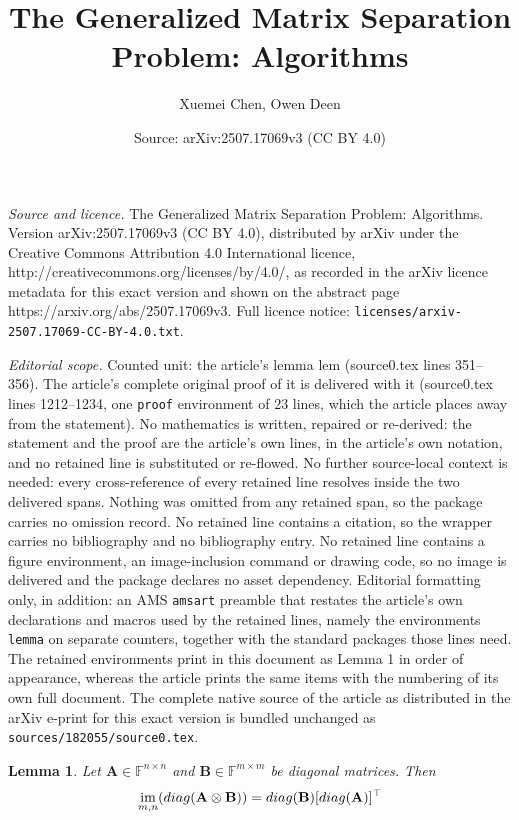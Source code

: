 \documentclass[10pt,a4paper]{amsart}
\title{The Generalized Matrix Separation Problem: Algorithms}
\author{Xuemei Chen, Owen Deen}
\date{Source: arXiv:2507.17069v3 (CC BY 4.0)}
\newtheorem{lemma}{Lemma}
\newcommand{\diag}{{\rm{diag}}}
\DeclareMathOperator*{\im}{{\rm{im}}}
\newcommand{\mA}{\mathbf{A}}
\newcommand{\mB}{\mathbf{B}}
\begin{document}
\maketitle

\noindent\emph{Source and licence.} The Generalized Matrix Separation Problem: Algorithms. Version arXiv:2507.17069v3 (CC BY 4.0), distributed by arXiv under the Creative Commons Attribution 4.0 International licence, http://creativecommons.org/licenses/by/4.0/, as recorded in the arXiv licence metadata for this exact version and shown on the abstract page https://arxiv.org/abs/2507.17069v3. Full licence notice: \texttt{licenses/arxiv-2507.17069-CC-BY-4.0.txt}.\par\smallskip

\noindent\textit{Editorial scope.} Counted unit: the article's lemma lem (source0.tex lines 351--356). The article's complete original proof of it is delivered with it (source0.tex lines 1212--1234, one \texttt{proof} environment of 23 lines, which the article places away from the statement). No mathematics is written, repaired or re-derived: the statement and the proof are the article's own lines, in the article's own notation, and no retained line is substituted or re-flowed.  No further source-local context is needed: every cross-reference of every retained line resolves inside the two delivered spans.  Nothing was omitted from any retained span, so the package carries no omission record.  No retained line contains a citation, so the wrapper carries no bibliography and no bibliography entry.  No retained line contains a figure environment, an image-inclusion command or drawing code, so no image is delivered and the package declares no asset dependency.  Editorial formatting only, in addition: an AMS \texttt{amsart} preamble that restates the article's own declarations and macros used by the retained lines, namely the environments \texttt{lemma} on separate counters, together with the standard packages those lines need.  The retained environments print in this document as Lemma 1 in order of appearance, whereas the article prints the same items with the numbering of its own full document.  The complete native source of the article as distributed in the arXiv e-print for this exact version is bundled unchanged as \texttt{sources/182055/source0.tex}.
\begin{lemma}\label{lem}
Let $\mA\in\mathbb{F}^{n\times n}$ and  $\mB\in\mathbb{F}^{m\times m}$ be diagonal matrices. Then
\begin{equation}\label{equ:lem}
\im_{m, n}(\diag(\mA\otimes \mB))=\diag(\mB)[\diag(\mA)]^\top
\end{equation}
\end{lemma}
\end{document}
